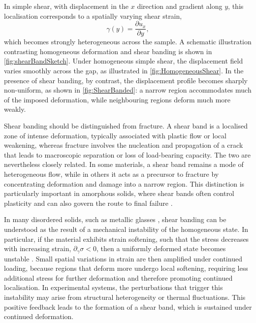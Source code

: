 \documentclass[asymmetricmargins]{library/duthesis}%
\begin{document}
In simple shear, with displacement in the $x$ direction and gradient along $y$, this localisation corresponds to a spatially varying shear strain,
\begin{equation}
    \gamma(y) = \frac{\partial u_x}{\partial y},
\end{equation}
which becomes strongly heterogeneous across the sample. A schematic illustration contrasting homogeneous deformation and shear banding is shown in \cref{fig:shearBandSketch}. Under homogeneous simple shear, the displacement field varies smoothly across the gap, as illustrated in \cref{fig:HomogeneousShear}. In the presence of shear banding, by contrast, the displacement profile becomes sharply non-uniform, as shown in \cref{fig:ShearBanded}: a narrow region accommodates much of the imposed deformation, while neighbouring regions deform much more weakly.

Shear banding should be distinguished from fracture. A shear band is a localised zone of intense deformation, typically associated with plastic flow or local weakening, whereas fracture involves the nucleation and propagation of a crack that leads to macroscopic separation or loss of load-bearing capacity. The two are nevertheless closely related. In some materials, a shear band remains a mode of heterogeneous flow, while in others it acts as a precursor to fracture by concentrating deformation and damage into a narrow region. This distinction is particularly important in amorphous solids, where shear bands often control plasticity and can also govern the route to final failure \cite{greer_shear_2013,hufnagel_deformation_2016,nicolas_deformation_2018}.

In many disordered solids, such as metallic glasses \cite{greer_shear_2013}, shear banding can be understood as the result of a mechanical instability of the homogeneous state. In particular, if the material exhibits strain softening, such that the stress decreases with increasing strain, $\partial_{\gamma}\sigma < 0$, then a uniformly deformed state becomes unstable \cite{barlow_ductile_2020}. Small spatial variations in strain are then amplified under continued loading, because regions that deform more undergo local softening, requiring less additional stress for further deformation and therefore promoting continued localisation. In experimental systems, the perturbations that trigger this instability may arise from structural heterogeneity or thermal fluctuations. This positive feedback leads to the formation of a shear band, which is sustained under continued deformation.
\end{document}
